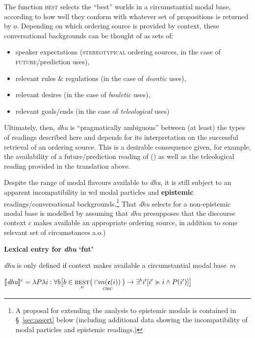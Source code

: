 The function \textsc{best} selects the ``best'' worlds in a circumstantial modal base, according to how well they conform with whatever set of propositions is returned by $ o $. Depending on which ordering source is provided by context, these conversational backgrounds can be thought of as sets of:
\begin{itemize}
	\item speaker expectations (\textsc{stereotypical} ordering sources, in the case of \textsc{future}\slash prediction uses), 
	\item relevant rules \& regulations (in the case of \textit{deontic} uses),
	\item  relevant desires (in the case of \textit{bouletic} uses),
	\item  relevant goals/ends (in the case of \textit{teleological} uses) 
\end{itemize}	
	
\noindent Ultimately, then, \textit{dhu} is ``pragmatically ambiguous'' between (at least) the types of readings described here and depends for its interpretation on the successful retrieval of an ordering source. This is a desirable consequence given, for example, the availability of a future/prediction reading of () as well as the teleological reading provided in the translation above.
	
	
Despite the range of modal flavours available to \textit{dhu}, it is still subject to an apparent incompatibility in \acrshort{wd} modal particles and \textbf{epistemic} readings\slash conversational backgrounds.\footnote{A proposal for extending the analysis to epistemic modals is contained in \S~\ref{sec:assert} below (including additional data showing the incompatibility of modal particles and epistemic readings.)} That \textit{dhu} selects for a non-epistemic modal base \citep[compare][]{Kratzer1981} is modelled by assuming that \textit{dhu} presupposes that the discourse context $ c $ makes available an appropriate ordering source, in addition to some relevant set of circumstances \citep[see also][]{Peterson2010,Rullmann2008,Matthewson2016} a.o.)



\pex \textbf{Lexical entry for \textit{dhu} `\gls{fut}'}

\textit{dhu} is only defined if context makes available a circumstantial modal base~$ m $

$ \denote[c]{\textit{dhu}}=\lambda P\lambda i:\forall b\big[b\in\underset{o}{\textsc{best}}\big(\underset{\textsc{circ}}{\cap m(\mathfrak e(i))}\big)\to\exists^b i'[i'\succcurlyeq i\wedge P(i')]\big] $

